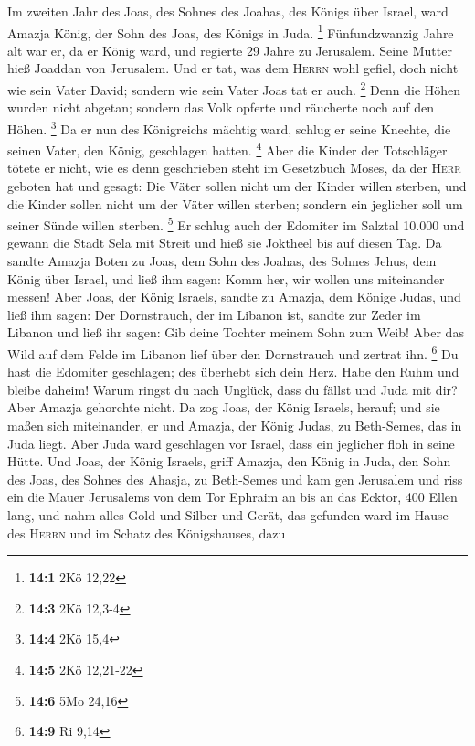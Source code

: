  Im zweiten Jahr des Joas, des Sohnes des Joahas, des
Königs über Israel, ward Amazja König, der Sohn des Joas, des Königs in
Juda. \footnote{\textbf{14:1} 2Kö 12,22}  Fünfundzwanzig
Jahre alt war er, da er König ward, und regierte 29 Jahre zu Jerusalem.
Seine Mutter hieß Joaddan von Jerusalem.  Und er tat, was
dem \textsc{Herrn} wohl gefiel, doch nicht wie sein Vater David; sondern
wie sein Vater Joas tat er auch. \footnote{\textbf{14:3} 2Kö 12,3-4}
 Denn die Höhen wurden nicht abgetan; sondern das Volk
opferte und räucherte noch auf den Höhen. \footnote{\textbf{14:4} 2Kö
  15,4}  Da er nun des Königreichs mächtig ward, schlug er
seine Knechte, die seinen Vater, den König, geschlagen hatten.
\footnote{\textbf{14:5} 2Kö 12,21-22}  Aber die Kinder der
Totschläger tötete er nicht, wie es denn geschrieben steht im Gesetzbuch
Moses, da der \textsc{Herr} geboten hat und gesagt: Die Väter sollen
nicht um der Kinder willen sterben, und die Kinder sollen nicht um der
Väter willen sterben; sondern ein jeglicher soll um seiner Sünde willen
sterben. \footnote{\textbf{14:6} 5Mo 24,16}  Er schlug
auch der Edomiter im Salztal 10.000 und gewann die Stadt Sela mit Streit
und hieß sie Joktheel bis auf diesen Tag.  Da sandte
Amazja Boten zu Joas, dem Sohn des Joahas, des Sohnes Jehus, dem König
über Israel, und ließ ihm sagen: Komm her, wir wollen uns miteinander
messen!  Aber Joas, der König Israels, sandte zu Amazja,
dem Könige Judas, und ließ ihm sagen: Der Dornstrauch, der im Libanon
ist, sandte zur Zeder im Libanon und ließ ihr sagen: Gib deine Tochter
meinem Sohn zum Weib! Aber das Wild auf dem Felde im Libanon lief über
den Dornstrauch und zertrat ihn. \footnote{\textbf{14:9} Ri 9,14}
 Du hast die Edomiter geschlagen; des überhebt sich dein
Herz. Habe den Ruhm und bleibe daheim! Warum ringst du nach Unglück,
dass du fällst und Juda mit dir?  Aber Amazja gehorchte
nicht. Da zog Joas, der König Israels, herauf; und sie maßen sich
miteinander, er und Amazja, der König Judas, zu Beth-Semes, das in Juda
liegt.  Aber Juda ward geschlagen vor Israel, dass ein
jeglicher floh in seine Hütte.  Und Joas, der König
Israels, griff Amazja, den König in Juda, den Sohn des Joas, des Sohnes
des Ahasja, zu Beth-Semes und kam gen Jerusalem und riss ein die Mauer
Jerusalems von dem Tor Ephraim an bis an das Ecktor, 400 Ellen lang,
 und nahm alles Gold und Silber und Gerät, das gefunden
ward im Hause des \textsc{Herrn} und im Schatz des Königshauses, dazu
